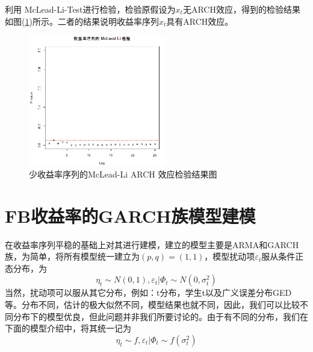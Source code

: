             利用 McLead-Li-Test进行检验，检验原假设为$x_t$无ARCH效应，得到的检验结果如图(\ref{少收益率序列的McLead-Li ARCH 效应检验结果图})所示。二者的结果说明收益率序列$x_t$具有ARCH效应。
            \begin{figure}[H]
            \centering
            \includegraphics[width = 6cm]{images/McLead_Li_ARCH.png}
            \caption{少收益率序列的McLead-Li ARCH 效应检验结果图}
            \label{少收益率序列的McLead-Li ARCH 效应检验结果图}
            \end{figure}
\section{FB收益率的GARCH族模型建模}
    \par
    在收益率序列平稳的基础上对其进行建模，建立的模型主要是ARMA和GARCH 族，为简单，将所有模型统一建立为$(p,q)=(1,1)$，模型扰动项$\varepsilon_t$服从条件正态分布，为
    \[{\eta _t} \sim N(0,1),{\varepsilon _t}|{\Phi _t} \sim N(0,\sigma _t^2)\]
    当然，扰动项可以服从其它分布，例如：t分布，学生t以及广义误差分布GED等。分布不同，估计的极大似然不同，模型结果也就不同，因此，我们可以比较不同分布下的模型优良，但此问题并非我们所要讨论的。由于有不同的分布，我们在下面的模型介绍中，将其统一记为
    \[{\eta _t} \sim f,{\varepsilon _t}|{\Phi _t} \sim f(\sigma _t^2)\]
